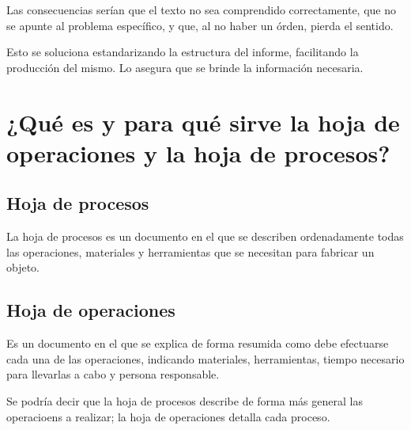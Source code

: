 \documentclass{article}
\begin{document}
Las consecuencias serían que el texto no sea comprendido correctamente, que no
se apunte al problema específico, y que, al no haber un órden, pierda el
sentido.

Esto se soluciona estandarizando la estructura del informe, facilitando la
producción del mismo. Lo asegura que se brinde la información necesaria.

\section{¿Qué es y para qué sirve la hoja de operaciones y la hoja de procesos?}
\subsection{Hoja de procesos}
La hoja de procesos es un documento en el que se describen ordenadamente todas
las operaciones, materiales y herramientas que se necesitan para fabricar un
objeto.

\subsection{Hoja de operaciones}
Es un documento en el que se explica de forma resumida como debe efectuarse
cada una de las operaciones, indicando materiales, herramientas, tiempo
necesario para llevarlas a cabo y persona responsable.

Se podría decir que la hoja de procesos describe de forma más general las
operacioens a realizar; la hoja de operaciones detalla cada proceso.
\end{document}
